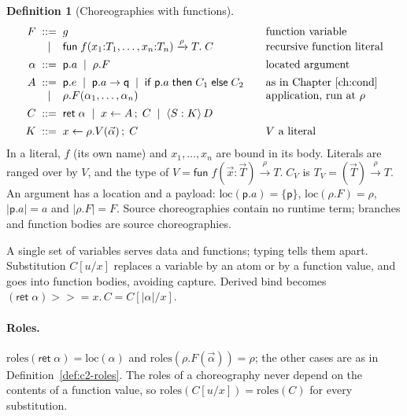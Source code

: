 \documentclass[11pt]{report}
\theoremstyle{plain}
\theoremstyle{definition}
\newtheorem{definition}[theorem]{Definition}
\theoremstyle{remark}
\newcommand{\kw}[1]{\mathsf{#1}}
\newcommand{\pp}{\mathsf{p}}
\newcommand{\qq}{\mathsf{q}}
\newcommand{\bind}[3]{#1 \leftarrow #2\,;\;#3}
\newcommand{\cret}[1]{\kw{ret}\;#1}
\newcommand{\com}[3]{#1.#2 \to #3}
\newcommand{\cif}[4]{\kw{if}\;#1.#2\;\kw{then}\;#3\;\kw{else}\;#4}
\newcommand{\mbind}[3]{#1 \mathbin{>\!\!>\!\!=} #2.\,#3}
\newcommand{\rt}[3]{\langle #1 : #2\rangle\,#3}
\newcommand{\roles}[1]{\mathrm{roles}(#1)}
\newcommand{\loc}[1]{\mathrm{loc}(#1)}
\newcommand{\pay}[1]{\lvert #1\rvert}
\newcommand{\farr}[3]{(#1) \xrightarrow{#2} #3}
\newcommand{\cfun}[5]{\kw{fun}\;#1(#2) \xrightarrow{#3} #4.\;#5}
\begin{document}
\begin{definition}[Choreographies with functions]\label{def:c4-syntax}
  \[
  \begin{array}{r@{\;\;}c@{\;\;}l@{\qquad}l}
    F & ::= & g & \text{function variable}\\
      & \mid & \cfun{f}{x_1{:}T_1,\ldots,x_n{:}T_n}{\rho}{T}{C} & \text{recursive function literal}\\[1ex]
    \alpha & ::= & \pp.a \;\mid\; \rho.F & \text{located argument}\\[1ex]
    A & ::= & \pp.e \;\mid\; \com{\pp}{a}{\qq} \;\mid\; \cif{\pp}{a}{C_1}{C_2} & \text{as in Chapter~\ref{ch:cond}}\\
      & \mid & \rho.F(\alpha_1,\ldots,\alpha_n) & \text{application, run at } \rho\\[1ex]
    C & ::= & \cret{\alpha} \;\mid\; \bind{x}{A}{C} \;\mid\; \rt{S}{K}{D}\\[1ex]
    K & ::= & \bind{x}{\rho.V(\vec\alpha)}{C} & V \text{ a literal}
  \end{array}
  \]
  In a literal, $f$ (its own name) and $x_1,\ldots,x_n$ are bound in its body.
  Literals are ranged over by $V$, and the type of
  $V=\cfun{f}{\vec x{:}\vec T}{\rho}{T}{C_V}$ is $T_V=\farr{\vec T}{\rho}{T}$.
  An argument has a location and a payload:
  $\loc{\pp.a}=\{\pp\}$, $\loc{\rho.F}=\rho$, $\pay{\pp.a}=a$ and
  $\pay{\rho.F}=F$.  Source choreographies contain no runtime term; branches
  and function bodies are source choreographies.
\end{definition}

A single set of variables serves data and functions; typing tells them apart.
Substitution $C[u/x]$ replaces a variable by an atom or by a function value,
and goes into function bodies, avoiding capture.  Derived bind becomes
$\mbind{(\cret{\alpha})}{x}{C}=C[\pay{\alpha}/x]$.

\paragraph{Roles.}
$\roles{\cret{\alpha}}=\loc{\alpha}$ and $\roles{\rho.F(\vec\alpha)}=\rho$;
the other cases are as in Definition~\ref{def:c2-roles}.  The roles of a
choreography never depend on the contents of a function value, so
$\roles{C[u/x]}=\roles{C}$ for every substitution.
\end{document}
